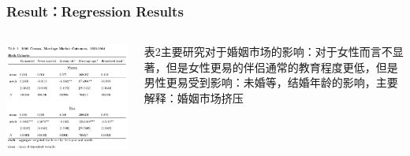 \documentclass{beamer}
\begin{document}
\begin{frame}
\frametitle{Result：Regression Results}
	\begin{columns}
            \begin{minipage}[c][0.4\textheight][c]{\linewidth}
                \centering
                \includegraphics[width=1\linewidth]{table2}
            \end{minipage}
           
           	\begin{minipage}[c][0.4\textheight][c]{\linewidth}
            表2主要研究对于婚姻市场的影响：对于女性而言不显著，但是女性更易的伴侣通常的教育程度更低，但是男性更易受到影响：未婚等，结婚年龄的影响，主要解释：婚姻市场挤压
            \end{minipage}
    \end{columns}
\end{frame}
\end{document}
